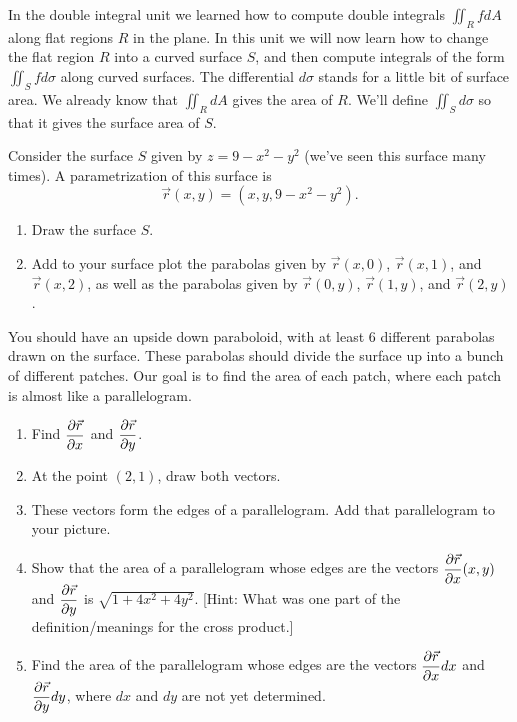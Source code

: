 In the double integral unit we learned how to compute double integrals $\iint_R fdA$ along flat regions $R$ in the plane. In this unit we will now learn how to change the flat region $R$ into a curved surface $S$, and then compute integrals of the form $\iint_S fd\sigma$ along curved surfaces. The differential $d\sigma$ stands for a little bit of surface area.  We already know that $\iint_R dA$ gives the area of $R$.  We'll define $\iint_S d\sigma$ so that it gives the surface area of $S$.


\begin{problem}
 Consider the surface $S$ given by $z=9-x^2-y^2$ (we've seen this surface many times). A parametrization of this surface is $$\vec r(x,y) = (x,y,9-x^2-y^2).$$
\begin{enumerate}
	\item {}%
Draw the surface $S$. 
	\item Add to your surface plot the parabolas given by $\vec r(x,0)$, $\vec r(x,1)$, and $\vec r(x,2)$, as well as the parabolas given by $\vec r(0,y)$, $\vec r(1,y)$, and $\vec r(2,y)$. 
\end{enumerate}
You should have an upside down paraboloid, with at least 6 different parabolas drawn on the surface.  These parabolas should divide the surface up into a bunch of different patches. Our goal is to find the area of each patch, where each patch is almost like a parallelogram. 
\begin{enumerate}[resume]
	\item Find $\displaystyle \frac{\partial \vec r}{\partial x}$ and $\displaystyle\frac{\partial \vec r}{\partial y}$. 
	\item At the point $(2,1)$, draw both vectors. 
	\item These vectors form the edges of a parallelogram. Add that parallelogram to your picture.
	\item Show that the area of a parallelogram whose edges are the vectors $\displaystyle\frac{\partial \vec r}{\partial x}(x,y)$ and $\displaystyle\frac{\partial \vec r}{\partial y}$ is $\sqrt{1+4x^2+4y^2}$. [Hint: What was one part of the definition/meanings for the cross product.]
 \item Find the area of the parallelogram whose edges are the vectors $\displaystyle\frac{\partial \vec r}{\partial x}dx$ and $\displaystyle\frac{\partial \vec r}{\partial y}dy$, where $dx$ and $dy$ are not yet determined.
\end{enumerate}
\end{problem}

